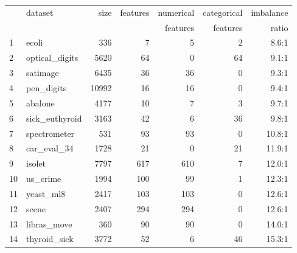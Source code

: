 \begin{table}
    \centering
        \begin{tabular}{llrrrrr}
        \toprule
                {}& dataset &    size &  features &  numerical &  categorical & imbalance \\
                & & & & features & features & ratio \\
        \midrule
        1 &           ecoli &     336 &         7 &                   5 &                     2 &           8.6:1 \\
        2 & optical\_digits &    5620 &        64 &                   0 &                    64 &           9.1:1 \\
        3 &       satimage &    6435 &        36 &                  36 &                     0 &           9.3:1 \\
        4 &     pen\_digits &   10992 &        16 &                  16 &                     0 &           9.4:1 \\
        5 &        abalone &    4177 &        10 &                   7 &                     3 &           9.7:1 \\
        6 & sick\_euthyroid &    3163 &        42 &                   6 &                    36 &           9.8:1 \\
        7 &   spectrometer &     531 &        93 &                  93 &                     0 &          10.8:1 \\
        8 &    car\_eval\_34 &    1728 &        21 &                   0 &                    21 &          11.9:1 \\
        9 &         isolet &    7797 &       617 &                 610 &                     7 &          12.0:1 \\
        10 &       us\_crime &    1994 &       100 &                  99 &                     1 &          12.3:1 \\
        11 &     yeast\_ml8 &    2417 &       103 &                 103 &                     0 &          12.6:1 \\
        12 &          scene &    2407 &       294 &                 294 &                     0 &          12.6:1 \\
        13 &    libras\_move &     360 &        90 &                  90 &                     0 &          14.0:1 \\
        14 &   thyroid\_sick &    3772 &        52 &                   6 &                    46 &          15.3:1 \\

\end{tabular}
\end{table}
